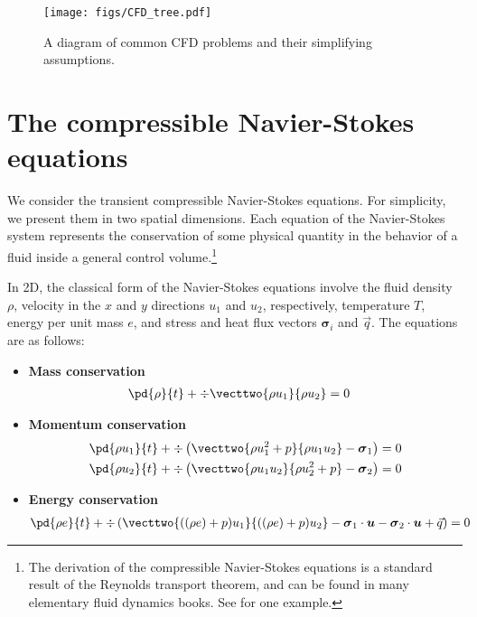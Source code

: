 

\begin{figure}[!h]
\centering
\texttt{[image: figs/CFD\_tree.pdf]}
\caption{A diagram of common CFD problems and their simplifying assumptions.}
\end{figure}

\section{The compressible Navier-Stokes equations}

We consider the transient compressible Navier-Stokes equations. For simplicity, we present them in two spatial dimensions. Each equation of the Navier-Stokes system represents the conservation of some physical quantity in the behavior of a fluid inside a general control volume.\footnote{The derivation of the compressible Navier-Stokes equations is a standard result of the Reynolds transport theorem, and can be found in many elementary fluid dynamics books. See \cite{Emanuel:994127} for one example.} 

In 2D, the classical form of the Navier-Stokes equations involve the fluid density $\rho$, velocity in the $x$ and $y$ directions $u_1$ and $u_2$, respectively, temperature $T$, energy per unit mass $e$, and stress and heat flux vectors $\boldsymbol \sigma_i$ and $\vec{q}$. The equations are as follows:
\begin{itemize}
\item{\textbf{Mass conservation}}
\begin{align*}
\pd{\rho}{t} + \div \vecttwo{\rho u_1 }{\rho u_2} &= 0
\end{align*}

\item{\textbf{Momentum conservation}}
\begin{align*}
\pd{\rho u_1}{t} + \div \left(\vecttwo{\rho u_1^2+p }{\rho u_1 u_2} - \boldsymbol \sigma_{1}\right) &=0\\
\pd{\rho u_2}{t} + \div \left(\vecttwo{\rho u_1 u_2}{\rho u_2^2+p } - \boldsymbol \sigma_{2}\right) &=0
\end{align*}

\item{\textbf{Energy conservation}}
\begin{align*}
\pd{\rho e}{t} + \div \left(\vecttwo{((\rho e)+p)u_1}{((\rho e)+p)u_2} - \boldsymbol \sigma_1 \cdot \boldsymbol u- \boldsymbol \sigma_2 \cdot \boldsymbol u + \vec{q}\right) &=0
\end{align*}
\end{itemize}

